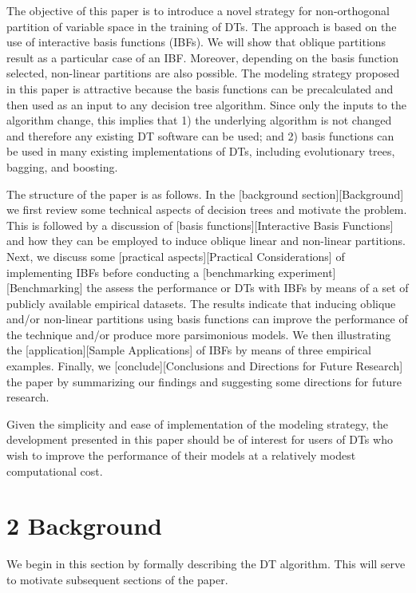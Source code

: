 \documentclass[]{elsarticle} %
\begin{document}
The objective of this paper is to introduce a novel strategy for
non-orthogonal partition of variable space in the training of DTs. The
approach is based on the use of interactive basis functions (IBFs). We
will show that oblique partitions result as a particular case of an IBF.
Moreover, depending on the basis function selected, non-linear
partitions are also possible. The modeling strategy proposed in this
paper is attractive because the basis functions can be precalculated and
then used as an input to any decision tree algorithm. Since only the
inputs to the algorithm change, this implies that 1) the underlying
algorithm is not changed and therefore any existing DT software can be
used; and 2) basis functions can be used in many existing
implementations of DTs, including evolutionary trees, bagging, and
boosting.

The structure of the paper is as follows. In the {[}background
section{]}{[}Background{]} we first review some technical aspects of
decision trees and motivate the problem. This is followed by a
discussion of {[}basis functions{]}{[}Interactive Basis Functions{]} and
how they can be employed to induce oblique linear and non-linear
partitions. Next, we discuss some {[}practical aspects{]}{[}Practical
Considerations{]} of implementing IBFs before conducting a
{[}benchmarking experiment{]}{[}Benchmarking{]} the assess the
performance or DTs with IBFs by means of a set of publicly available
empirical datasets. The results indicate that inducing oblique and/or
non-linear partitions using basis functions can improve the performance
of the technique and/or produce more parsimonious models. We then
illustrating the {[}application{]}{[}Sample Applications{]} of IBFs by
means of three empirical examples. Finally, we
{[}conclude{]}{[}Conclusions and Directions for Future Research{]} the
paper by summarizing our findings and suggesting some directions for
future research.

Given the simplicity and ease of implementation of the modeling
strategy, the development presented in this paper should be of interest
for users of DTs who wish to improve the performance of their models at
a relatively modest computational cost.

\section{2 Background}\label{background}

We begin in this section by formally describing the DT algorithm. This
will serve to motivate subsequent sections of the paper.
\end{document}
